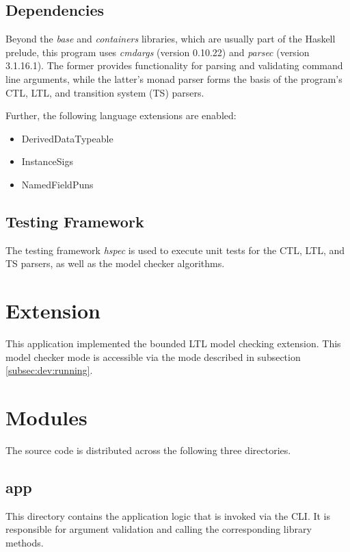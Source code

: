 \documentclass[11pt]{article}
\begin{document}
\subsection{Dependencies}

Beyond the \textit{base} and \textit{containers} libraries, which are usually part of the Haskell prelude, this program uses \textit{cmdargs} (version 0.10.22) and \textit{parsec} (version 3.1.16.1).
The former provides functionality for parsing and validating command line arguments, while the latter's monad parser forms the basis of the program's CTL, LTL, and transition system (TS) parsers.

Further, the following language extensions are enabled:

\begin{itemize}
  \item DerivedDataTypeable
  \item InstanceSigs
  \item NamedFieldPuns
\end{itemize}


\subsection{Testing Framework}

The testing framework \textit{hspec} is used to execute unit tests for the CTL, LTL, and TS parsers, as well as the model checker algorithms.

\section{Extension}

This application implemented the bounded LTL model checking extension.
This model checker mode is accessible via the mode described in subsection \ref{subsec:dev:running}.

\section{Modules}

The source code is distributed across the following three directories.

\subsection{app}

This directory contains the application logic that is invoked via the CLI.
It is responsible for argument validation and calling the corresponding library methods.
\end{document}
